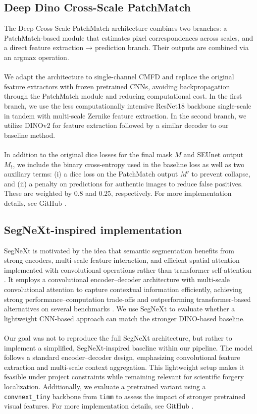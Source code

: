 \documentclass[final]{nldl}
\begin{document}
\subsection{Deep Dino Cross-Scale PatchMatch}
The Deep Cross-Scale PatchMatch architecture \cite{li2024deeppatchmatch} combines two branches: a PatchMatch-based module \cite{barnes2009patchmatch} that estimates pixel correspondences across scales, and a direct feature extraction → prediction branch. Their outputs are combined via an argmax operation. 
\\\\
We adapt the architecture to single-channel CMFD and replace the original feature extractors with frozen pretrained CNNs, avoiding backpropagation through the PatchMatch module and reducing computational cost. In the first branch, we use the less computationally intensive ResNet18 backbone \cite{he2016deep} single-scale in tandem with multi-scale Zernike feature extraction. In the second branch, we utilize DINOv2 for feature extraction followed by a similar decoder to our baseline method.
\\\\
In addition to the original dice losses for the final mask $M$ and SEUnet output $M_t$, we include the binary cross-entropy used in the baseline loss as well as two auxiliary terms: (i) a dice loss on the PatchMatch output $M'$ to prevent collapse, and (ii) a penalty on predictions for authentic images to reduce false positives. These are weighted by $0.8$ and $0.25$, respectively. For more implementation details, see GitHub \cite{max_crosscale_patchmatch}.
\subsection{SegNeXt-inspired implementation}
SegNeXt is motivated by the idea that semantic segmentation benefits from strong encoders, multi-scale feature interaction, and efficient spatial attention implemented with convolutional operations rather than transformer self-attention \cite{segnext}. It employs a convolutional encoder–decoder architecture with multi-scale convolutional attention to capture contextual information efficiently, achieving strong performance–computation trade-offs and outperforming transformer-based alternatives on several benchmarks \cite{segnext}. We use SegNeXt to evaluate whether a lightweight CNN-based approach can match the stronger DINO-based baseline.
\\\\
Our goal was not to reproduce the full SegNeXt architecture, but rather to implement a simplified, SegNeXt-inspired baseline within our pipeline. The model follows a standard encoder–decoder design, emphasizing convolutional feature extraction and multi-scale context aggregation. This lightweight setup makes it feasible under project constraints while remaining relevant for scientific forgery localization. Additionally, we evaluate a pretrained variant using a \texttt{convnext\_tiny} backbone from \texttt{timm} to assess the impact of stronger pretrained visual features. For more implementation details, see GitHub \cite{emre_segnext}.
\end{document}
